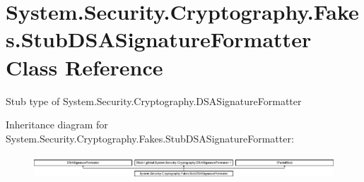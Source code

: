 \hypertarget{class_system_1_1_security_1_1_cryptography_1_1_fakes_1_1_stub_d_s_a_signature_formatter}{\section{System.\-Security.\-Cryptography.\-Fakes.\-Stub\-D\-S\-A\-Signature\-Formatter Class Reference}
\label{class_system_1_1_security_1_1_cryptography_1_1_fakes_1_1_stub_d_s_a_signature_formatter}
}


Stub type of System.\-Security.\-Cryptography.\-D\-S\-A\-Signature\-Formatter 


Inheritance diagram for System.\-Security.\-Cryptography.\-Fakes.\-Stub\-D\-S\-A\-Signature\-Formatter\-:\begin{figure}[H]
\begin{center}
\leavevmode
\includegraphics[height=0.886778cm]{class_system_1_1_security_1_1_cryptography_1_1_fakes_1_1_stub_d_s_a_signature_formatter}
\end{center}
\end{figure}
